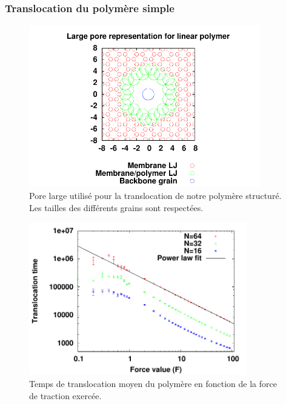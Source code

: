 \documentclass[a4paper,11pt]{article}
\begin{document}
\subsubsection{Translocation du polymère simple}

\begin{figure}[H]
\begin{center}
\includegraphics[width=0.9\textwidth]{simplepolpore.pdf}


\caption{Pore large utilisé pour la translocation de notre polymère structuré. Les tailles des différents grains sont respectées. }
\label{porelargesimplepol}
\end{center}
\end{figure}




 
 
\begin{figure}[H]
\begin{center}
\includegraphics[width=0.85\textwidth]{translocpolsimple.pdf} 
\caption{Temps de translocation moyen du polymère en fonction de la force de traction exercée.}
\label{taupolsimple}
\end{center}
\end{figure}
\end{document}

